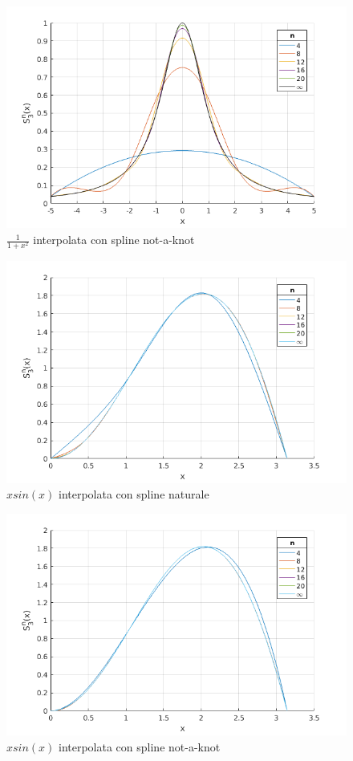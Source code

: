 \begin{figure}
\centering
\includegraphics[width=\textwidth]{cap_4/es5/runge_nak}
\caption{$\frac{1}{1+x^2}$ interpolata con spline not-a-knot}
\label{plot_runge_nak}
\end{figure}

\begin{figure}
\centering
\includegraphics[width=\textwidth]{cap_4/es5/sin_nat}
\caption{$xsin(x)$ interpolata con spline naturale}
\label{plot_sin_nat}
\end{figure}

\begin{figure}
\centering
\includegraphics[width=\textwidth]{cap_4/es5/sin_nak}
\caption{$xsin(x)$ interpolata con spline not-a-knot}
\label{plot_sin_nak}
\end{figure}

